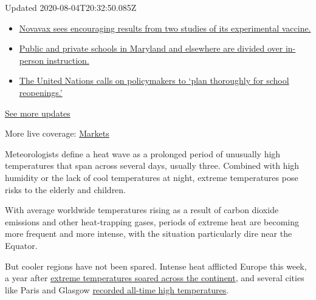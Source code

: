 Updated 2020-08-04T20:32:50.085Z

\begin{itemize}
\tightlist
\item
  \href{https://www.nytimes.com/2020/08/04/world/coronavirus-cases.html?action=click\&pgtype=Article\&state=default\&region=MAIN_CONTENT_1\&context=storylines_live_updates\#link-1228a480}{Novavax
  sees encouraging results from two studies of its experimental
  vaccine.}
\item
  \href{https://www.nytimes.com/2020/08/04/world/coronavirus-cases.html?action=click\&pgtype=Article\&state=default\&region=MAIN_CONTENT_1\&context=storylines_live_updates\#link-4825b93}{Public
  and private schools in Maryland and elsewhere are divided over
  in-person instruction.}
\item
  \href{https://www.nytimes.com/2020/08/04/world/coronavirus-cases.html?action=click\&pgtype=Article\&state=default\&region=MAIN_CONTENT_1\&context=storylines_live_updates\#link-50f7386d}{The
  United Nations calls on policymakers to `plan thoroughly for school
  reopenings.'}
\end{itemize}

\href{https://www.nytimes.com/2020/08/04/world/coronavirus-cases.html?action=click\&pgtype=Article\&state=default\&region=MAIN_CONTENT_1\&context=storylines_live_updates}{See
more updates}

More live coverage:
\href{https://www.nytimes.com/live/2020/08/04/business/stock-market-today-coronavirus?action=click\&pgtype=Article\&state=default\&region=MAIN_CONTENT_1\&context=storylines_live_updates}{Markets}

Meteorologists define a heat wave as a prolonged period of unusually
high temperatures that span across several days, usually three. Combined
with high humidity or the lack of cool temperatures at night, extreme
temperatures pose risks to the elderly and children.

With average worldwide temperatures rising as a result of carbon dioxide
emissions and other heat-trapping gases, periods of extreme heat are
becoming more frequent and more intense, with the situation particularly
dire near the Equator.

But cooler regions have not been spared. Intense heat afflicted Europe
this week, a year after
\href{https://www.nytimes.com/2019/06/26/world/europe/europe-heat-wave.html}{extreme
temperatures soared across the continent}, and several cities like Paris
and Glasgow
\href{https://www.nytimes.com/2019/07/25/world/europe/heatwave-record-temperatures.html}{recorded
all-time high temperatures}.


